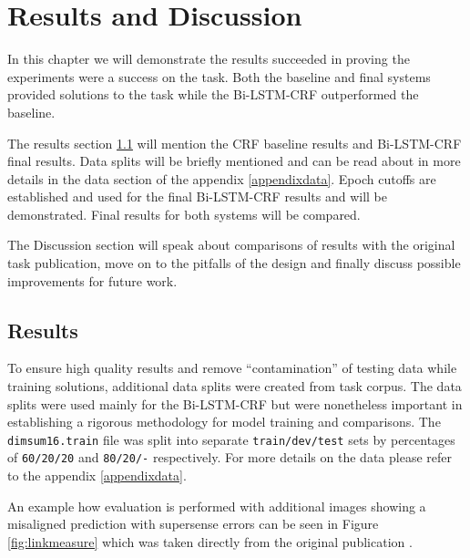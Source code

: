 \chapter{Results and Discussion}\label{chapter5}

In this chapter we will demonstrate the results succeeded in proving the experiments were a success on the \dimsum task. Both the baseline and final systems provided solutions to the task while the Bi-LSTM-CRF outperformed the baseline.

The results section \ref{chapter5results} will mention the CRF baseline results and Bi-LSTM-CRF final results. Data splits will be briefly mentioned and can be read about in more details in the data section of the appendix \ref{appendixdata}. Epoch cutoffs are established and used for the final Bi-LSTM-CRF results and will be demonstrated. Final results for both systems will be compared.

The Discussion section will speak about comparisons of results with the original task publication, move on to the pitfalls of the design and finally discuss possible improvements for future work.

\section{Results}\label{chapter5results}
To ensure high quality results and remove ``contamination'' of testing data while training solutions, additional data splits were created from \dimsum task corpus. The data splits were used mainly for the Bi-LSTM-CRF but were nonetheless important in establishing a rigorous methodology for model training and comparisons. The \texttt{dimsum16.train} file was split into separate \texttt{train/dev/test} sets by percentages of \texttt{60/20/20} and \texttt{80/20/-} respectively. For more details on the data please refer to the appendix \ref{appendixdata}.

An example how evaluation is performed with additional images showing a misaligned prediction with supersense errors can be seen in Figure \ref{fig:linkmeasure} which was taken directly from the original \dimsum publication \cite{Schneider2016}.

